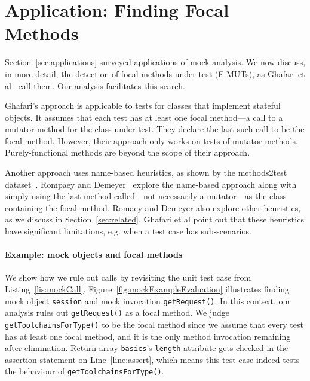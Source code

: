 \section{Application: Finding Focal Methods}
\label{sec:focal}

Section~\ref{sec:applications} surveyed applications of mock analysis.
We now discuss, in more detail, the detection of focal methods under test
(F-MUTs), as Ghafari et
al~\cite{ghafari15:_autom} call them.
Our analysis facilitates this search.

Ghafari's approach is applicable to tests for classes that implement
stateful objects. It assumes that each test has at least one focal
method---a call to a mutator method for the class under test.
They declare the last such call to be the focal method. However, their approach 
only works on tests of mutator methods.  Purely-functional methods are beyond the scope of their approach.

Another approach uses name-based heuristics, 
as shown by the methods2test
dataset~\cite{tufano2020unit}.  
Rompaey and
Demeyer~\cite{rompaey09:_estab_traceab_links_unit_test} explore the
name-based approach along with simply using the last method called---not necessarily a mutator---as the class containing the focal method.  Romaey and Demeyer also
explore other heuristics, as we discuss in Section~\ref{sec:related}. Ghafari et al point out
that these heuristics have significant limitations, e.g. when a
test case has sub-scenarios.

\paragraph{Example: mock objects and focal methods} We show how we rule out calls by revisiting the unit test case from Listing~\ref{lis:mockCall}. Figure~\ref{fig:mockExampleEvaluation} illustrates finding mock object \texttt{session} and mock invocation \texttt{getRequest()}. In this context, our analysis rules out \texttt{getRequest()} as a focal method. We judge \texttt{getToolchainsForType()} to be the focal method since we assume that every test has at least one focal method, and it is the only method invocation remaining after elimination. Return array \texttt{basics}'s \texttt{length} attribute gets checked in the assertion statement on Line~\ref{line:assert}, which means this test case indeed tests the behaviour of \texttt{getToolchainsForType()}. 

